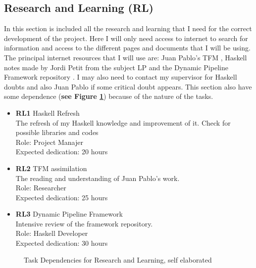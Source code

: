 \subsection{Research and Learning \textbf{(RL)}}
In this section is included all the research and learning that I need for the correct development of the project.
Here I will only need access to internet to search for information and access to the different pages and documents that I will be using.
The principal internet resources that I will use are: Juan Pablo's TFM \cite{TFM}, Haskell notes made by Jordi Petit from the subject LP \cite{ApuntesHaskell} and the Dynamic Pipeline Framework repository \cite{GitHubDynamicPipeline}.
I may also need to contact my supervisor for Haskell doubts and also Juan Pablo if some critical doubt appears.
This section also have some dependence (\textbf{see Figure \ref{RL_dependences}}) because of the nature of the tasks.
\begin{itemize}
    \item \textbf{RL1} Haskell Refresh \\
        The refresh of my Haskell knowledge and improvement of it. 
        Check for possible libraries and codes \\
        Role: Project Manajer \\
        Expected dedication: 20 hours
    \item \textbf{RL2} TFM assimilation\\
        The reading and understanding of Juan Pablo's work. \\
        Role: Researcher \\
        Expected dedication: 25 hours
    \item \textbf{RL3} Dynamic Pipeline Framework \\
        Intensive review of the framework repository. \\
        Role: Haskell Developer \\
        Expected dedication: 30 hours 
\end{itemize}
\begin{figure}[h]
    \centering
    \caption{Task Dependencies for Research and Learning, self elaborated}
    \label{RL_dependences}
\end{figure}


